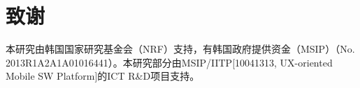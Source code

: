 \section{致谢}

本研究由韩国国家研究基金会（NRF）支持，有韩国政府提供资金（MSIP）（No. 2013R1A2A1A01016441）。本研究部分由MSIP/IITP[10041313, UX-oriented Mobile SW Platform]的ICT R\&D项目支持。
